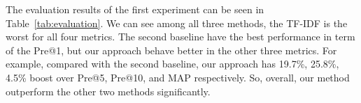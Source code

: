 The evaluation results of the first experiment can be seen in Table~\ref{tab:evaluation}.
We can see among all three methods, the TF-IDF is the worst for all four metrics.
The second baseline have the best performance in term of the Pre@1, but our approach behave better in the other three metrics.
For example, compared with the second baseline, our approach has 19.7\%, 25.8\%, 4.5\% boost over Pre@5, Pre@10, and MAP respectively.
So, overall, our method outperform the other two methods significantly.

\begin{comment}
Our semantic similarity model is based on the deep learning technique and uses word embedding to calculate the semantic similarity between two question titles, which is totally different with the traditional TF-IDF approach. And the comparison between these two approaches is in Table 5. Respectively, our DSSM model outperforms the baseline in several important criterions.
The Table 6 also shows the comparison between the Word-n-Gram and Letter-Trigram CLSM baseline and our approach. 
All the Pre@K metrics of our approach are higher than those of the baseline2 except Pr@1. Because the data we used to train our deep semantic similarity model is the duplicate pairs manually marked by experts of Stack Overflow community, there are many other highly similar questions are still not marked. 
\par
In addition, our mode is a binary classification model, so it basically divides all the questions into two types, which are duplicate and non-duplicate. However, some non-duplicate question pairs generated for training are not totally without relation, which means some questions that recommended by our approach should be very similar to the query, but they are not marked duplicate. 
\par
The results confirm us that our deep semantic similarity model is effective in the Information retrieval area. Generally, a user always needs to get a large number of relative posts by the recommendation system, and our approach is better than the Baseline2 when they both recommending a large number of posts.
\par
\end{comment}

